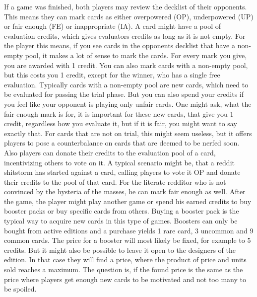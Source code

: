 \documentclass{article}
\begin{document}
If a game was finished, both players may review the decklist of their opponents. This means they can mark cards as either overpowered (OP), underpowered (UP) or fair enough (FE) or inappropriate (IA). A card might have a pool of evaluation credits, which gives evaluators credits as long as it is not empty. For the player this means, if you see cards in the opponents decklist that have a non-empty pool, it makes a lot of sense to mark the cards. For every mark you give, you are awarded with 1 credit. You can also mark cards with a non-empty pool, but this costs you 1 credit, except for the winner, who has a single free evaluation. Typically cards with a non-empty pool are new cards, which need to be evaluated for passing the trial phase. But you can also spend your credits if you feel like your opponent is playing only unfair cards. One might ask, what the fair enough mark is for, it is important for these new cards, that give you 1 credit, regardless how you evaluate it, but if it is fair, you might want to say exactly that. For cards that are not on trial, this might seem useless, but it offers players to pose a counterbalance on cards that are deemed to be nerfed soon. Also players can donate their credits to the evaluation pool of a card, incentivizing others to vote on it. A typical scenario might be, that a reddit shitstorm has started against a card, calling players to vote it OP and donate their credits to the pool of that card. For the literate redditor who is not convinced by the hysteria of the masses, he can mark fair enough as well.
%
\newline \newline
%
After the game, the player might play another game or spend his earned credits to buy booster packs or buy specific cards from others. Buying a booster pack is the typical way to acquire new cards in this type of games. Boosters can only be bought from active editions and a purchase yields 1 rare card, 3 uncommon and 9 common cards. The price for a booster will most likely be fixed, for example to 5 credits. But it might also be possible to leave it open to the designers of the edition. In that case they will find a price, where the product of price and units sold reaches a maximum. The question is, if the found price is the same as the price where players get enough new cards to be motivated and not too many to be spoiled.
%
\newline \newline
%
\end{document}
